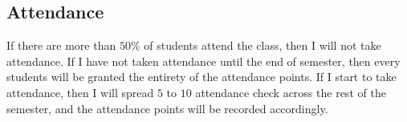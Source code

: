 \documentclass[12pt]{article}
\begin{document}
\subsection*{Attendance}
\label{sub:Attendance}

If there are more than $ 50\% $ of students attend the class, then I will not take attendance.
If I have not taken attendance until the end of semester, then every students will be granted the entirety of the attendance points.
If I start to take attendance, then I will spread $ 5 $ to $ 10 $ attendance check across the rest of the semester, and the attendance points will be recorded accordingly.








\end{document}

